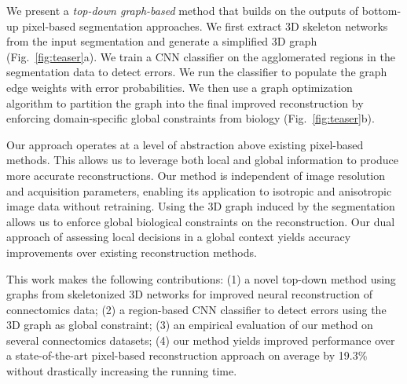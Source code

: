 We present a \textit{top-down graph-based} method that builds on the outputs of bottom-up pixel-based segmentation approaches. We first extract 3D skeleton networks from the input segmentation and generate a simplified 3D graph (Fig.~\ref{fig:teaser}a). We train a CNN classifier on the agglomerated regions in the segmentation data to detect errors. We run the classifier to populate the graph edge weights with error probabilities. We then use a graph optimization algorithm to partition the graph into the final improved reconstruction by enforcing domain-specific global constraints from biology (Fig.~\ref{fig:teaser}b).

Our approach operates at a level of abstraction above existing pixel-based methods. This allows us to leverage both local and global information to produce more accurate reconstructions. Our method is independent of image resolution and acquisition parameters, enabling its application to isotropic and anisotropic image data without retraining. Using the 3D graph induced by the segmentation allows us to enforce global biological constraints on the reconstruction. Our dual approach of assessing local decisions in a global context yields accuracy improvements over existing reconstruction methods.

This work makes the following contributions: (1) a novel top-down method using  graphs from skeletonized 3D networks for improved neural reconstruction of connectomics data; (2) a region-based CNN classifier to detect errors using the 3D graph as global constraint; (3) an empirical evaluation of our method on several connectomics datasets; (4) our method yields improved performance over a state-of-the-art pixel-based reconstruction approach on average by 19.3\% without drastically increasing the running time.
